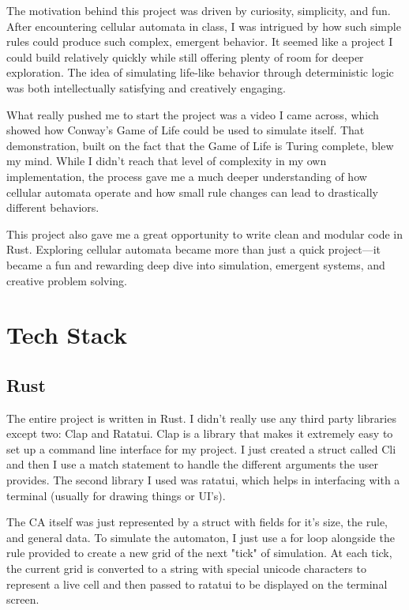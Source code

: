 \documentclass[12pt]{article}
\begin{document}
{	The motivation behind this project was driven by curiosity, simplicity, and fun. After encountering cellular automata in class, I was intrigued by how such simple rules could produce such complex, emergent behavior. It seemed like a project I could build relatively quickly while still offering plenty of room for deeper exploration. The idea of simulating life-like behavior through deterministic logic was both intellectually satisfying and creatively engaging.

	What really pushed me to start the project was a video I came across, which showed how Conway’s Game of Life could be used to simulate itself. That demonstration, built on the fact that the Game of Life is Turing complete, blew my mind. While I didn’t reach that level of complexity in my own implementation, the process gave me a much deeper understanding of how cellular automata operate and how small rule changes can lead to drastically different behaviors.

	This project also gave me a great opportunity to write clean and modular code in Rust. Exploring cellular automata became more than just a quick project—it became a fun and rewarding deep dive into simulation, emergent systems, and creative problem solving.
}

\section{Tech Stack}
\subsection{Rust}
The entire project is written in Rust. I didn't really use any third party libraries except two: Clap and Ratatui. Clap is a library that makes it extremely easy to set up a command line interface for my project. I just created a struct called Cli and then I use a match statement to handle the different arguments the user provides. The second library I used was ratatui, which helps in interfacing with a terminal (usually for drawing things or UI's).

The CA itself was just represented by a struct with fields for it's size, the rule, and general data. To simulate the automaton, I just use a for loop alongside the rule provided to create a new grid of the next "tick" of simulation. At each tick, the current grid is converted to a string with special unicode characters to represent a live cell and then passed to ratatui to be displayed on the terminal screen.
\end{document}
